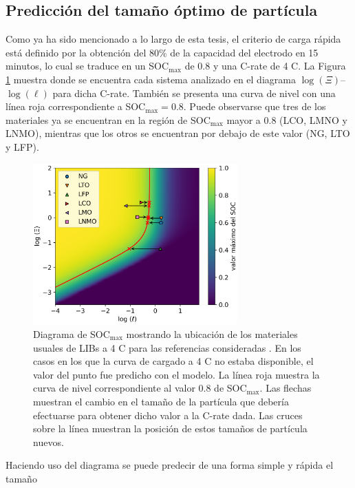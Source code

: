 \subsection{Predicción del tamaño óptimo de partícula}

Como ya ha sido mencionado a lo largo de esta tesis, el criterio de carga rápida
está definido por la obtención del 80\% de la capacidad del electrodo en 15 
minutos, lo cual se traduce en un SOC$_{\max}$ de 0.8 y una C-rate de 4 C. La
Figura \ref{fig:prediccion} muestra donde se encuentra cada sistema analizado en
el diagrama $\log(\Xi)$--$\log(\ell)$ para dicha C-rate. También se presenta una
curva de nivel con una línea roja correspondiente a SOC$_{\max} = 0.8$. Puede
observarse que tres de los materiales ya se encuentran en la región de 
SOC$_{\max}$ mayor a 0.8 (LCO, LMNO y LNMO), mientras que los otros se encuentran
por debajo de este valor (NG, LTO y LFP).
\begin{figure}[h!]
    \centering
    \includegraphics[width=0.7\textwidth]{FastCharging/un/resultados/prediccion/prediccion.png}
    \caption{Diagrama de SOC$_{\max}$ mostrando la ubicación de los materiales 
    usuales de LIBs a 4 C para las referencias consideradas \cite{mancini2022,
    he2012, lei2015, wang2019high, bak2011, nishikawa2017}. En los casos en los 
    que la curva de cargado a 4 C no estaba disponible, el valor del punto fue 
    predicho con el modelo. La línea roja muestra la curva de nivel 
    correspondiente al valor 0.8 de SOC$_{\max}$. Las flechas muestran el cambio
    en el tamaño de la partícula que debería efectuarse para obtener dicho valor
    a la C-rate dada. Las cruces sobre la línea muestran la posición de estos
    tamaños de partícula nuevos.}
    \label{fig:prediccion}
\end{figure}
Haciendo uso del diagrama se puede predecir de una forma simple y rápida el tamaño 
